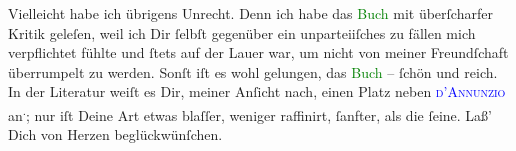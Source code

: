 \pstart
           Vielleicht habe ich übrigens Unrecht. Denn ich habe das \textcolor{green}{Buch}{}\ledrightnote{{$\rightarrow$}\textcolor{green}{Sterben. Novelle}} mit überſcharfer Kritik geleſen, weil ich
                  \strikeout{\textcolor{gray}{mir}} Dir ſelbſt gegenüber ein unparteiiſches zu fällen mich verpflichtet fühlte und
               ſtets auf der Lauer war, um nicht von meiner Freundſchaft überrumpelt zu werden.
               Sonſt iſt es wohl gelungen, das \textcolor{green}{Buch}{}\ledrightnote{{$\rightarrow$}\textcolor{green}{Sterben. Novelle}} – ſchön und reich. In der Literatur {\pb}weiſt es Dir, meiner Anſicht nach, einen Platz neben \textsc{\textcolor{blue}{d’Annunzio}{}\ledrightnote{\textcolor{blue}{Gabriele D’Annunzio}}} an\substVorne{}\textsuperscript{.}\substDazwischen{};\substHinten{} nur iſt Deine Art etwas blaſſer, weniger raffinirt, ſanfter, als die ſeine.
               Laß’ Dich von Herzen beglückwünſchen.\pend
           
